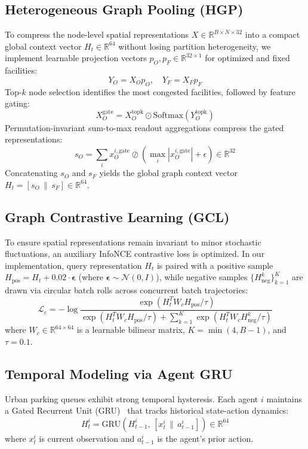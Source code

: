 \documentclass[journal]{IEEEtran}
\begin{document}
\subsection{Heterogeneous Graph Pooling (HGP)}
To compress the node-level spatial representations $X \in \mathbb{R}^{B \times N \times 32}$ into a compact global context vector $H_t \in \mathbb{R}^{64}$ without losing partition heterogeneity, we implement learnable projection vectors $p_O, p_F \in \mathbb{R}^{32 \times 1}$ for optimized and fixed facilities:
\begin{equation}
Y_O = X_O p_O, \quad Y_F = X_F p_F
\end{equation}
Top-$k$ node selection identifies the most congested facilities, followed by feature gating:
\begin{equation}
X_O^{\text{gate}} = X_O^{\text{topk}} \odot \text{Softmax}(Y_O^{\text{topk}})
\end{equation}
Permutation-invariant sum-to-max readout aggregations compress the gated representations:
\begin{equation}
s_O = \sum_{i} x_O^{i, \text{gate}} \oslash \left(\max_{i} |x_O^{i, \text{gate}}| + \epsilon\right) \in \mathbb{R}^{32}
\end{equation}
Concatenating $s_O$ and $s_F$ yields the global graph context vector $H_t = [s_O \,\|\, s_F] \in \mathbb{R}^{64}$.

\subsection{Graph Contrastive Learning (GCL)}
To ensure spatial representations remain invariant to minor stochastic fluctuations, an auxiliary InfoNCE contrastive loss is optimized. In our implementation, query representation $H_t$ is paired with a positive sample $H_{\text{pos}} = H_t + 0.02 \cdot \boldsymbol{\epsilon}$ (where $\boldsymbol{\epsilon} \sim \mathcal{N}(0, I)$), while negative samples $\{H_{\text{neg}}^k\}_{k=1}^{K}$ are drawn via circular batch rolls across concurrent batch trajectories:
\begin{equation}
\mathcal{L}_c = -\log \frac{\exp\left(H_t^T W_c H_{\text{pos}} / \tau\right)}{\exp\left(H_t^T W_c H_{\text{pos}} / \tau\right) + \sum_{k=1}^{K} \exp\left(H_t^T W_c H_{\text{neg}}^k / \tau\right)}
\label{eq:infonce}
\end{equation}
where $W_c \in \mathbb{R}^{64 \times 64}$ is a learnable bilinear matrix, $K = \min(4, B-1)$, and $\tau = 0.1$.

\subsection{Temporal Modeling via Agent GRU}
Urban parking queues exhibit strong temporal hysteresis. Each agent $i$ maintains a Gated Recurrent Unit (GRU)~\cite{cho2014learning} that tracks historical state-action dynamics:
\begin{equation}
H_t^i = \text{GRU}\left(H_{t-1}^i, \, [x_t^i \,\|\, a_{t-1}^i]\right) \in \mathbb{R}^{64}
\label{eq:gru}
\end{equation}
where $x_t^i$ is current observation and $a_{t-1}^i$ is the agent's prior action.
\end{document}
